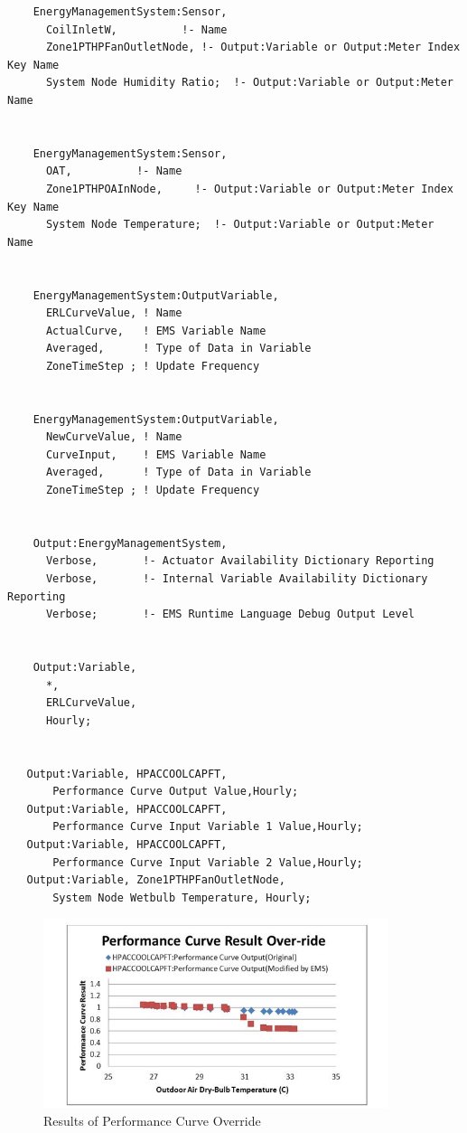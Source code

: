 \begin{lstlisting}
    EnergyManagementSystem:Sensor,
      CoilInletW,          !- Name
      Zone1PTHPFanOutletNode, !- Output:Variable or Output:Meter Index Key Name
      System Node Humidity Ratio;  !- Output:Variable or Output:Meter Name


    EnergyManagementSystem:Sensor,
      OAT,          !- Name
      Zone1PTHPOAInNode,     !- Output:Variable or Output:Meter Index Key Name
      System Node Temperature;  !- Output:Variable or Output:Meter Name


    EnergyManagementSystem:OutputVariable,
      ERLCurveValue, ! Name
      ActualCurve,   ! EMS Variable Name
      Averaged,      ! Type of Data in Variable
      ZoneTimeStep ; ! Update Frequency


    EnergyManagementSystem:OutputVariable,
      NewCurveValue, ! Name
      CurveInput,    ! EMS Variable Name
      Averaged,      ! Type of Data in Variable
      ZoneTimeStep ; ! Update Frequency


    Output:EnergyManagementSystem,
      Verbose,       !- Actuator Availability Dictionary Reporting
      Verbose,       !- Internal Variable Availability Dictionary Reporting
      Verbose;       !- EMS Runtime Language Debug Output Level


    Output:Variable,
      *,
      ERLCurveValue,
      Hourly;


   Output:Variable, HPACCOOLCAPFT,
       Performance Curve Output Value,Hourly;
   Output:Variable, HPACCOOLCAPFT,
       Performance Curve Input Variable 1 Value,Hourly;
   Output:Variable, HPACCOOLCAPFT,
       Performance Curve Input Variable 2 Value,Hourly;
   Output:Variable, Zone1PTHPFanOutletNode,
       System Node Wetbulb Temperature, Hourly;
\end{lstlisting}

\begin{figure}[hbtp] %
\centering
\includegraphics[width=0.9\textwidth, height=0.9\textheight, keepaspectratio=true]{media/image011.jpg}
\caption{Results of Performance Curve Override \protect \label{fig:results-of-performance-curve-override}}
\end{figure}
